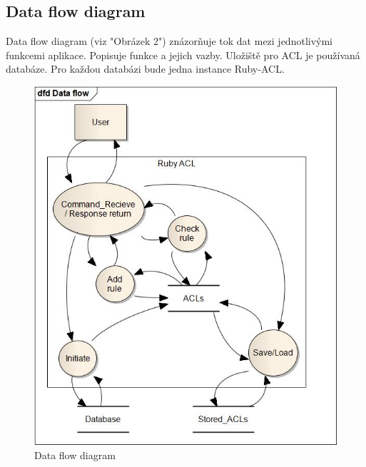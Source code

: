 \documentclass[11pt,twoside,a4paper]{book}
\begin{document}

\subsection{Data flow diagram}
Data flow diagram (viz "Obrázek 2") znázorňuje tok dat mezi jednotlivými funkcemi aplikace. Popisuje funkce a jejich vazby. Uložiště pro ACL je používaná databáze. Pro každou databázi bude jedna instance Ruby-ACL.
\begin{figure}
\includegraphics[width=15cm]{DataFlowBigFont.jpg}
\caption{Data flow diagram}
\label{fig:Data flow diagram}
\end{figure}

\end{document}
